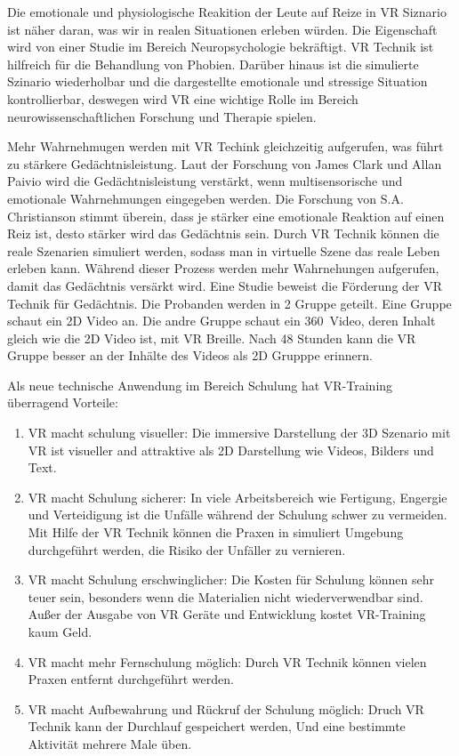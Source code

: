 Die emotionale und physiologische Reakition der Leute auf Reize in VR Siznario ist näher daran, was wir in realen Situationen erleben würden. Die Eigenschaft wird von einer Studie im Bereich Neuropsychologie bekräftigt. VR Technik ist hilfreich für die Behandlung von Phobien\citep{12}. Darüber hinaus ist die simulierte Szinario wiederholbar und die dargestellte emotionale und stressige Situation kontrollierbar, deswegen wird VR eine wichtige Rolle im Bereich neurowissenschaftlichen Forschung und Therapie spielen.\citep{13}

Mehr Wahrnehmugen werden mit VR Techink gleichzeitig aufgerufen, was führt zu stärkere Gedächtnisleistung. Laut der Forschung von James Clark und Allan Paivio\citep{10} wird die Gedächtnisleistung verstärkt, wenn multisensorische und emotionale Wahrnehmungen eingegeben werden. Die Forschung von S.A. Christianson\citep{11} stimmt überein, dass je stärker eine emotionale Reaktion auf einen Reiz ist, desto stärker wird das Gedächtnis sein. Durch VR Technik können die reale Szenarien simuliert werden, sodass man in virtuelle Szene das reale Leben erleben kann. Während dieser Prozess werden mehr Wahrnehungen aufgerufen, damit das Gedächtnis versärkt wird. Eine Studie\citep{12} beweist die Förderung der VR Technik für Gedächtnis. Die Probanden werden in 2 Gruppe geteilt. Eine Gruppe schaut ein 2D Video an. Die andre Gruppe schaut ein 360\degree\ Video, deren Inhalt gleich wie die 2D Video ist, mit VR Breille. Nach 48 Stunden kann die VR Gruppe besser an der Inhälte des Videos als 2D Grupppe erinnern.

Als neue technische Anwendung im Bereich Schulung hat VR-Training überragend Vorteile\citep{15}:

\begin{enumerate}
\item VR macht schulung visueller: Die immersive Darstellung der 3D Szenario mit VR ist visueller and attraktive als 2D Darstellung wie Videos, Bilders und Text.
\item VR macht Schulung sicherer: In viele Arbeitsbereich wie Fertigung, Engergie und Verteidigung ist die Unfälle während der Schulung schwer zu vermeiden. Mit Hilfe der VR Technik können die Praxen in simuliert Umgebung durchgeführt werden, die Risiko der Unfäller zu vernieren.
\item VR macht Schulung erschwinglicher: Die Kosten für Schulung können sehr teuer sein, besonders wenn die Materialien nicht wiederverwendbar sind. Außer der Ausgabe von VR Geräte und Entwicklung kostet VR-Training kaum Geld.
\item VR macht mehr Fernschulung möglich: Durch VR Technik können vielen Praxen entfernt durchgeführt werden.
\item VR macht Aufbewahrung und Rückruf der Schulung möglich: Druch VR Technik kann der Durchlauf gespeichert werden, Und eine bestimmte Aktivität mehrere Male üben.
\end{enumerate}\


